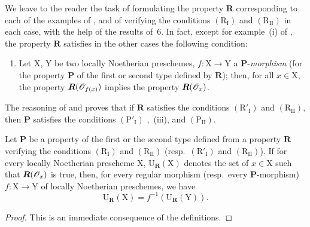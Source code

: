 \begin{remark}[7.3.11]
\label{IV.7.3.11}
We leave to the reader the task of formulating the property $\boldsymbol{R}$ corresponding to each of the examples of , and of verifying the conditions $(\mathrm{R_I})$ and $(\mathrm{R_{II}})$ in each case, with the help of the results of \textsection\,6.
In fact, except for example~(i) of , the property $\boldsymbol{R}$ satisfies in the other cases the following condition:
\begin{enumerate}
  \item[$(\mathrm{R}'_\mathrm{I})$] Let $\mathrm{X}$, $\mathrm{Y}$ be two locally Noetherian preschemes, $f:\mathrm{X}\to\mathrm{Y}$ a $\boldsymbol{P}$-\emph{morphism} (for the property $\boldsymbol{P}$ of the first or second type defined by $\boldsymbol{R}$); then, for all $x\in\mathrm{X}$, the property $\boldsymbol{R}(\mathscr{O}_{f(x)})$ implies the property $\boldsymbol{R}(\mathscr{O}_x)$.
\end{enumerate}
The reasoning of  and  proves that if $\boldsymbol{R}$ satisfies the conditions $(\mathrm{R}'_\mathrm{I})$ and $(\mathrm{R_{II}})$, then $\boldsymbol{P}$ satisfies the conditions $(\mathrm{P'_I})$ ,~(iii), and $(\mathrm{P_{II}})$.
\end{remark}

\begin{proposition}[7.3.12]
\label{IV.7.3.12}
Let $\boldsymbol{P}$ be a property of the first or the second type defined from a property $\boldsymbol{R}$ verifying the conditions $(\mathrm{R_I})$ and $(\mathrm{R_{II}})$ \textup{(resp.}~$(\mathrm{R}'_\mathrm{I})$ and $(\mathrm{R_{II}})$).
If for every locally Noetherian prescheme $\mathrm{X}$, $\mathrm{U}_{\mathbf{R}}(\mathrm{X})$ denotes the set of $x\in\mathrm{X}$ such that $\boldsymbol{R}(\mathscr{O}_x)$ is true, then, for every regular morphism \textup{(resp.}~every $\boldsymbol{P}$-morphism) $f:\mathrm{X}\to\mathrm{Y}$ of locally Noetherian preschemes, we have
\[
  \mathrm{U}_{\mathbf{R}}(\mathrm{X})=f^{-1}(\mathrm{U}_{\mathbf{R}}(\mathrm{Y})).
  \tag{7.3.12.1}
\label{IV.7.3.12.1}
\]
\end{proposition}

\begin{proof}
This is an immediate consequence of the definitions.
\end{proof}


